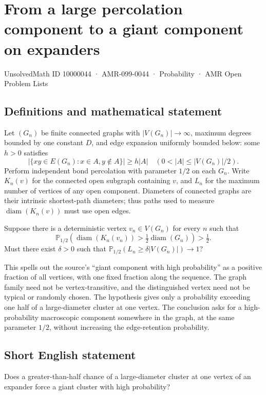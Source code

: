 \documentclass[11pt,a4paper]{article}
\begin{document}
\section*{From a large percolation component to a giant component on expanders}\label{10000044}
{\small UnsolvedMath ID 10000044 · AMR-099-0044 · Probability · AMR Open Problem Lists}
\subsection{Definitions and mathematical statement}
Let $(G_n)$ be finite connected graphs with $|V(G_n)|\to\infty$, maximum degrees bounded by one constant $D$, and edge expansion uniformly bounded below: some $h>0$ satisfies
\[
|\{xy\in E(G_n):x\in A,y\notin A\}|\ge h|A|
\quad(0<|A|\le |V(G_n)|/2).
\]
Perform independent bond percolation with parameter $1/2$ on each $G_n$. Write $K_n(v)$ for the connected open subgraph containing $v$, and $L_n$ for the maximum number of vertices of any open component. Diameters of connected graphs are their intrinsic shortest-path diameters; thus paths used to measure $\operatorname{diam}(K_n(v))$ must use open edges.

Suppose there is a deterministic vertex $v_n\in V(G_n)$ for every $n$ such that
\[
\mathbb P_{1/2}\!\left(\operatorname{diam}(K_n(v_n))>
\tfrac12\operatorname{diam}(G_n)\right)>\tfrac12.
\]
Must there exist $\delta>0$ such that $\mathbb P_{1/2}(L_n\ge\delta|V(G_n)|)\to1$?

This spells out the source's ``giant component with high probability'' as a positive fraction of all vertices, with one fixed fraction along the sequence. The graph family need not be vertex-transitive, and the distinguished vertex need not be typical or randomly chosen. The hypothesis gives only a probability exceeding one half of a large-diameter cluster at one vertex. The conclusion asks for a high-probability macroscopic component somewhere in the graph, at the same parameter $1/2$, without increasing the edge-retention probability.
\subsection{Short English statement}
Does a greater-than-half chance of a large-diameter cluster at one vertex of an expander force a giant cluster with high probability?
\end{document}
